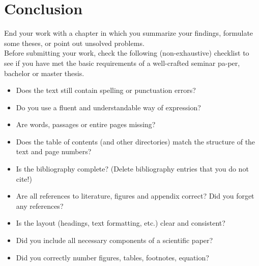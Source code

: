 \documentclass[11pt,a4paper]{article}
\begin{document}
\newpage



\section{Conclusion}
End your work with a chapter in which you summarize your findings, formulate some theses, or point out unsolved problems.\\
Before submitting your work, check the following (non-exhaustive) checklist to see if you have met the basic requirements of a well-crafted seminar pa-per, bachelor or master thesis.
\begin{itemize}
	\item Does the text still contain spelling or punctuation errors?
	\item Do you use a fluent and understandable way of expression?
	\item Are words, passages or entire pages missing?
	\item Does the table of contents (and other directories) match the structure of the text and page numbers?
	\item Is the bibliography complete? (Delete bibliography entries that you do not cite!)
	\item Are all references to literature, figures and appendix correct? Did you forget any references?
	\item Is the layout (headings, text formatting, etc.) clear and consistent?
	\item Did you include all necessary components of a scientific paper?
	\item Did you correctly number figures, tables, footnotes, equation?
	
\end{itemize}
\newpage



\pagestyle{fancy}						
\fancyhf{}								
\fancyhead[R]{}							 
\renewcommand{\headrulewidth}{0pt}	 
\fancyfoot[R]{\thepage}				 
\renewcommand{\footrulewidth}{0pt}	 
\setcounter{page}{5}
\newpage\clearpage

\newpage
{}
\end{document}
